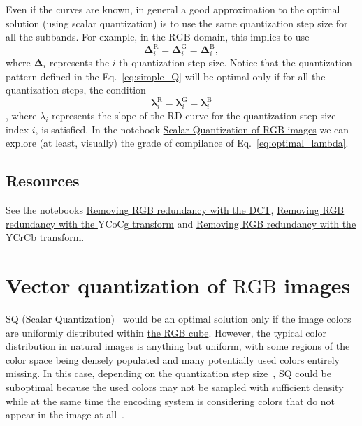 Even if the curves are known, in general a good approximation to the
optimal solution (using scalar quantization) is to use the same
quantization step size for all the subbands. For example, in the
$\text{RGB}$ domain, this implies to use
\begin{equation}
  \mathbf{\Delta}^{\text{R}}_i = \mathbf{\Delta}^{\text{G}}_i =
  \mathbf{\Delta}^{\text{B}}_i,
  \label{eq:simple_Q}
\end{equation}
where $\mathbf{\Delta}_i$ represents the $i$-th quantization step
size. Notice that the quantization pattern defined in the
Eq.~\eqref{eq:simple_Q} will be optimal only if for all the
quantization steps, the condition
\begin{equation}
  \mathbf{\lambda}^{\text{R}}_i = \mathbf{\lambda}^{\text{G}}_i =
  \mathbf{\lambda}^{\text{B}}_i
  \label{eq:optimal_lambda}
\end{equation}
, where $\lambda_i$ represents the slope of the RD curve for the
quantization step size index $i$, is satisfied. In the notebook
\href{https://github.com/Sistemas-Multimedia/Sistemas-Multimedia.github.io/blob/master/contents/RGB_SQ/RGB_SQ.ipynb}{Scalar
  Quantization of RGB images} we can explore (at least, visually) the
grade of compilance of Eq.~\eqref{eq:optimal_lambda}.

\subsection*{Resources}
See the notebooks
\href{https://github.com/vicente-gonzalez-ruiz/color_transforms/blob/main/docs/3DCT/3DCT_over_RGB.ipynb}{Removing
  RGB redundancy with the DCT},
\href{https://github.com/vicente-gonzalez-ruiz/color_transforms/blob/main/docs/YCoCg/YCoCg_over_RGB.ipynb}{Removing
  RGB redundancy with the $\text{YCoCg}$ transform} and
\href{https://github.com/vicente-gonzalez-ruiz/color_transforms/blob/main/docs/YCrCb/YCrCb_over_RGB.ipynb}{Removing
  RGB redundancy with the $\text{YCrCb}$ transform}.

\section{Vector quantization of $\text{RGB}$ images}

SQ (Scalar
Quantization)~\cite{vruiz__scalar_quantization,sayood2017introduction}
would be an optimal solution only if the image colors are uniformly
distributed within
\href{https://en.wikipedia.org/wiki/RGB_color_model}{the RGB
  cube}. However, the typical color distribution in natural images is
anything but uniform, with some regions of the color space being
densely populated and many potentially used colors entirely
missing. In this case, depending on the quantization step
size~\cite{vruiz__signal_quantization}, SQ could be suboptimal because
the used colors may not be sampled with suﬃcient density while at the
same time the encoding system is considering colors that do not appear
in the image at all~\cite{burger2016digital}.

